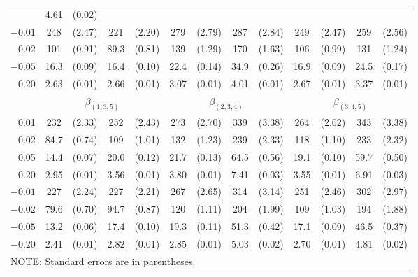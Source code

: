 \begin{table}[htp]
\begin{tabular}{r|cccc|cccc|cccc}
& 4.61 & (0.02)
\\
$-0.01$ & 248 & (2.47) & 221 & (2.20) & 279 & (2.79) & 287 & (2.84) & 249 & (2.47) &
259 & (2.56)
\\
$-0.02$ & 101 & (0.91) & 89.3 & (0.81) & 139 & (1.29) & 170 & (1.63) & 106 & (0.99)
& 131 & (1.24)
\\
$-0.05$ & 16.3 & (0.09) & 16.4 & (0.10) & 22.4 & (0.14) & 34.9 & (0.26) & 16.9 &
(0.09) & 24.5 & (0.17)
\\
$-0.20$ & 2.63 & (0.01) & 2.66 & (0.01) & 3.07 & (0.01) & 4.01 & (0.01) & 2.67 &
(0.01) & 3.37 & (0.01)
\\\hline
& \multicolumn{4}{c|}{$\beta_{(1,3,5)}$} & \multicolumn{4}{c|}{$\beta_{(2,3,4)}$} &
\multicolumn{4}{c}{$\beta_{(3,4,5)}$}
\\\hline
0.01 & 232 & (2.33) & 252 & (2.43) & 273 & (2.70) & 339 & (3.38) & 264 & (2.62) &
343 & (3.38)
\\
0.02 & 84.7 & (0.74) & 109 & (1.01) & 132 & (1.23) & 239 & (2.33) & 118 & (1.10) &
233 & (2.32)
\\
0.05 & 14.4 & (0.07) & 20.0 & (0.12) & 21.7 & (0.13) & 64.5 & (0.56) & 19.1 & (0.10)
& 59.7 & (0.50)
\\
0.20 & 2.95 & (0.01) & 3.56 & (0.01) & 3.80 & (0.01) & 7.41 & (0.03) & 3.55 & (0.01)
& 6.91 & (0.03)
\\
$-0.01$ & 227 & (2.24) & 227 & (2.21) & 267 & (2.65) & 314 & (3.14) & 251 & (2.46) &
302 & (2.97)
\\
$-0.02$ & 79.6 & (0.70) & 94.7 & (0.87) & 120 & (1.11) & 204 & (1.99) & 109 & (1.03)
& 194 & (1.88)
\\
$-0.05$ & 13.2 & (0.06) & 17.4 & (0.10) & 19.3 & (0.11) & 51.3 & (0.42) & 17.1 &
(0.09) & 46.5 & (0.37)
\\
$-0.20$ & 2.41 & (0.01) & 2.82 & (0.01) & 2.85 & (0.01) & 5.03 & (0.02) & 2.70 &
(0.01) & 4.81 & (0.02)
\\\hline
\multicolumn{13}{l}{NOTE: Standard errors are in parentheses.}
\end{tabular}
\end{table}


